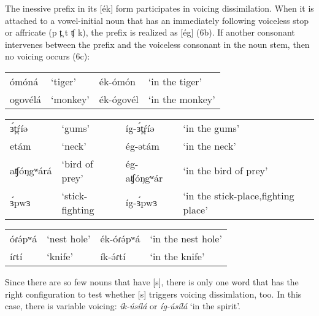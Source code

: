 The inessive prefix in its [ék] form participates in voicing dissimilation. When it is attached to a vowel-initial noun that has an immediately following voiceless stop or affricate (p t̪ t ʧ k), the prefix is realized as [ég] (6b). If another consonant intervenes between the prefix and the voiceless consonant in the noun stem, then no voicing occurs (6c):

\ea	
	\ea 	
	\begin{tabular}[t]{llll}
			ómóná	& 	‘tiger’	&	ék-ómón		&‘in the tiger’\\
			ogovélá	&	‘monkey’	&	ék-ógovél	&‘in the monkey’\\
	\end{tabular}
	\ex 	
	\begin{tabular}[t]{llll}
			ɜ́t̪ŕíə		&	‘gums’	&	íg-ɜ́t̪ŕíə	&	‘in the gums’	\\
 			etám		&	‘neck’	&	ég-ətám		&	‘in the neck’\\
			aʧóŋgʷárá	&‘bird of prey’	&	ég-aʧóŋgʷár	&‘in the bird of prey’	\\
			ɜ́pwɜ		&	‘stick-fighting	&	íg-ɜ́pwɜ	&	‘in the stick-place,fighting place’	\\
	\end{tabular}
	\ex		
	\begin{tabular}[t]{llll}
			óɾə́pʷá	&‘nest hole’	&	ék-óɾə́pʷá	&‘in the nest hole’\\
			íɾtí	&‘knife’		&	ík-ə́ɾtí		&‘in the knife’\\
	\end{tabular}
	\z
\z

Since there are so few nouns that have [s], there is only one word that has the right configuration to test whether [s] triggers voicing dissimlation, too. In this case, there is variable voicing: \textit{ík-úsílá} or \textit{íg-úsílá} ‘in the spirit’.    

%
%
%

%

